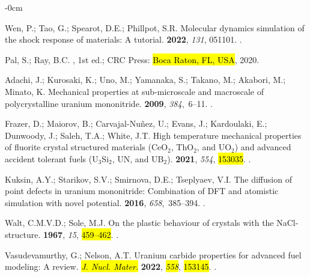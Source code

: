 \documentclass[applsci,article,accept,pdftex,moreauthors]{Definitions/mdpi}
\newcommand{\?}{\stackrel{?}{=}}
\begin{document}
\begin{adjustwidth}{-\extralength}{0cm}
\begin{thebibliography}{999}
Wen, P.; Tao, G.; Spearot, D.E.; Phillpot, S.R.
\newblock Molecular dynamics simulation of the shock response of materials: A
  tutorial.
 {\bf 2022}, {\em 131}, 051101.
.

Pal, S.; Ray, B.C.
, 1st ed.; CRC Press:  \hl{Boca Raton, FL, USA},  2020.

Adachi, J.; Kurosaki, K.; Uno, M.; Yamanaka, S.; Takano, M.; Akabori, M.;
  Minato, K.
\newblock Mechanical properties at sub-microscale and macroscale of
  polycrystalline uranium mononitride.
 {\bf 2009}, {\em 384},~6--11. .

Frazer, D.; Maiorov, B.; Carvajal-Nuñez, U.; Evans, J.; Kardoulaki, E.;
  Dunwoody, J.; Saleh, T.A.; White, J.T.
\newblock High temperature mechanical properties of fluorite crystal structured
  materials ({CeO$_2$}, {ThO$_2$}, and {UO$_2$}) and advanced accident tolerant
  fuels ({U$_3$Si$_2$}, {UN}, and {UB$_2$}).
 {\bf 2021}, {\em 554}, \hl{153035}.
.

Kuksin, A.Y.; Starikov, S.V.; Smirnova, D.E.; Tseplyaev, V.I.
\newblock The diffusion of point defects in uranium mononitride: Combination of
  {DFT} and atomistic simulation with novel potential.
 {\bf 2016}, {\em
  658},~385--394.
.

Walt, C.M.V.D.; Sole, M.J.
\newblock On the plastic behaviour of crystals with the {NaCl}-structure.
 {\bf 1967}, {\em 15}, \hl{459--462}.
.

Vasudevamurthy, G.; Nelson, A.T.
\newblock Uranium carbide properties for advanced fuel modeling: A review.
\emph{\hl{J. Nucl. Mater.}} \textbf{2022}, \emph{\hl{558}}, \hl{153145}.
.


\end{thebibliography}
\end{adjustwidth}
\end{document}
